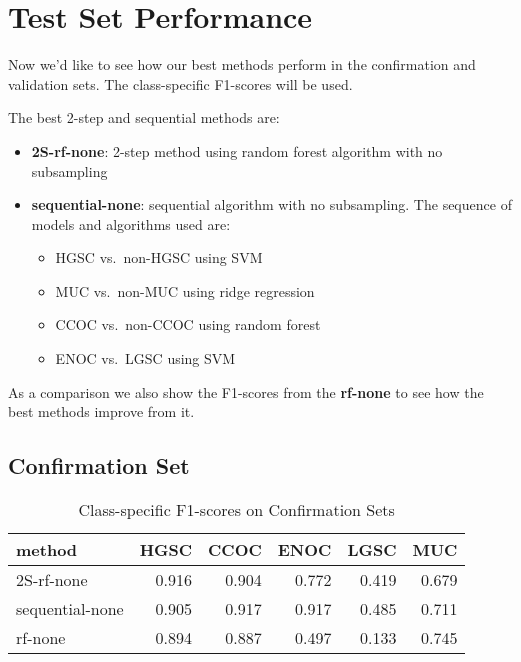 \documentclass[
]{report}
\providecommand{\tightlist}{%
  \setlength{\itemsep}{0pt}\setlength{\parskip}{0pt}}
\begin{document}
\hypertarget{test-set-performance}{%
\section{Test Set Performance}\label{test-set-performance}}

Now we'd like to see how our best methods perform in the confirmation and validation sets. The class-specific F1-scores will be used.

The best 2-step and sequential methods are:

\begin{itemize}
\tightlist
\item
  \textbf{2S-rf-none}: 2-step method using random forest algorithm with no subsampling
\item
  \textbf{sequential-none}: sequential algorithm with no subsampling. The sequence of models and algorithms used are:

  \begin{itemize}
  \tightlist
  \item
    HGSC vs.~non-HGSC using SVM
  \item
    MUC vs.~non-MUC using ridge regression
  \item
    CCOC vs.~non-CCOC using random forest
  \item
    ENOC vs.~LGSC using SVM
  \end{itemize}
\end{itemize}

As a comparison we also show the F1-scores from the \textbf{rf-none} to see how the best methods improve from it.

\hypertarget{confirmation-set}{%
\subsection{Confirmation Set}\label{confirmation-set}}

\begin{table}

\caption{\label{tab:confirmation-set}Class-specific F1-scores on Confirmation Sets}
\centering
\begin{tabular}[t]{l|r|r|r|r|r}
\hline
method & HGSC & CCOC & ENOC & LGSC & MUC\\
\hline
2S-rf-none & 0.916 & 0.904 & 0.772 & 0.419 & 0.679\\
\hline
sequential-none & 0.905 & 0.917 & 0.917 & 0.485 & 0.711\\
\hline
rf-none & 0.894 & 0.887 & 0.497 & 0.133 & 0.745\\
\hline
\end{tabular}
\end{table}
\end{document}
